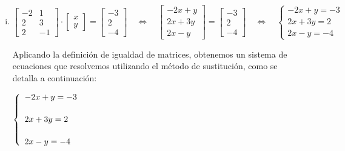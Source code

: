 \documentclass[11pt]{article}
\newcommand{\indicador}[4]{
{\tikz[remember picture,overlay]\coordinate (#1) at #2;}{\tikz[remember picture,overlay]\coordinate (#3) at #4;} 
}
\newcommand{\marka}[2]{
{\tikz[remember picture,overlay]\coordinate (#1) at #2;}
}
\begin{document}
\begin{enumerate}[\hspace{-5mm} 1) ]
\begin{enumerate}[a)]
\begin{enumerate}[a)]
\begin{enumerate}[i)]
        \item $\begin{bmatrix} -2 & 1 \\ 2 & 3 \\ 2 & -1 \end{bmatrix} \cdot \begin{bmatrix} x \\ y \end{bmatrix} = \begin{bmatrix} -3 \\ 2 \\ -4 \end{bmatrix}
        \quad
        \Longleftrightarrow
        \quad
        \begin{bmatrix} -2x + y \\ 2x +3y \\ 2x-y\end{bmatrix} 
        = \begin{bmatrix} -3 \\ 2 \\ -4 \end{bmatrix} 
        \quad
        \Longleftrightarrow
        \quad
        \left\{\begin{array}{l}         
        -2x+y = -3  
        \\[2mm]
        2x+3y = 2  
        \\[2mm]
        2x-y = -4
        \end{array}\right.
        $

 Aplicando la definición de igualdad de matrices, obtenemos un sistema de ecuaciones que resolvemos utilizando el método de sustitución, como se detalla a continuación:

\medskip

$\left\{\begin{array}{l}         
        -2x+y = -3  \indicador{x}{(.1,.15)}{y}{(1.3,.15)}
        \\[5mm]
        2x+3y = 2 \marka{a}{(.1,.15)}
        \\[5mm]
        2x-y = -4
        \end{array}\right.$


\end{enumerate}
\end{enumerate}
\end{enumerate}
\end{enumerate}
\end{document}
